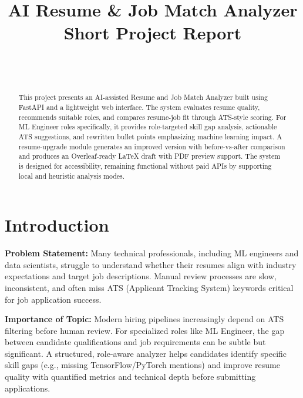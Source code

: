 \documentclass[conference]{IEEEtran}
\begin{document}
\title{AI Resume \& Job Match Analyzer\\
\large Short Project Report}

\author{\\
\\
}

\maketitle

\begin{abstract}
This project presents an AI-assisted Resume and Job Match Analyzer built using FastAPI and a lightweight web interface. The system evaluates resume quality, recommends suitable roles, and compares resume-job fit through ATS-style scoring. For ML Engineer roles specifically, it provides role-targeted skill gap analysis, actionable ATS suggestions, and rewritten bullet points emphasizing machine learning impact. A resume-upgrade module generates an improved version with before-vs-after comparison and produces an Overleaf-ready LaTeX draft with PDF preview support. The system is designed for accessibility, remaining functional without paid APIs by supporting local and heuristic analysis modes.
\end{abstract}

\section{Introduction}
\textbf{Problem Statement:} Many technical professionals, including ML engineers and data scientists, struggle to understand whether their resumes align with industry expectations and target job descriptions. Manual review processes are slow, inconsistent, and often miss ATS (Applicant Tracking System) keywords critical for job application success.

\textbf{Importance of Topic:} Modern hiring pipelines increasingly depend on ATS filtering before human review. For specialized roles like ML Engineer, the gap between candidate qualifications and job requirements can be subtle but significant. A structured, role-aware analyzer helps candidates identify specific skill gaps (e.g., missing TensorFlow/PyTorch mentions) and improve resume quality with quantified metrics and technical depth before submitting applications.
\end{document}
